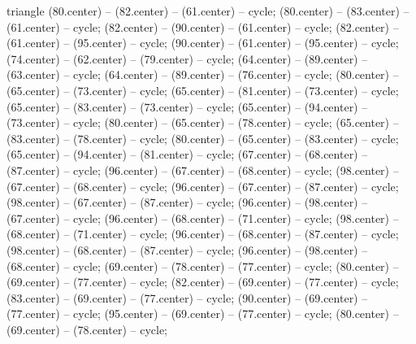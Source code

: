 \begin{pgfonlayer}{triangle}
 (80.center) -- (82.center) -- (61.center) -- cycle; 
 (80.center) -- (83.center) -- (61.center) -- cycle; 
 (82.center) -- (90.center) -- (61.center) -- cycle; 
 (82.center) -- (61.center) -- (95.center) -- cycle; 
 (90.center) -- (61.center) -- (95.center) -- cycle; 
 (74.center) -- (62.center) -- (79.center) -- cycle; 
 (64.center) -- (89.center) -- (63.center) -- cycle; 
 (64.center) -- (89.center) -- (76.center) -- cycle; 
 (80.center) -- (65.center) -- (73.center) -- cycle; 
 (65.center) -- (81.center) -- (73.center) -- cycle; 
 (65.center) -- (83.center) -- (73.center) -- cycle; 
 (65.center) -- (94.center) -- (73.center) -- cycle; 
 (80.center) -- (65.center) -- (78.center) -- cycle; 
 (65.center) -- (83.center) -- (78.center) -- cycle; 
 (80.center) -- (65.center) -- (83.center) -- cycle; 
 (65.center) -- (94.center) -- (81.center) -- cycle; 
 (67.center) -- (68.center) -- (87.center) -- cycle; 
 (96.center) -- (67.center) -- (68.center) -- cycle; 
 (98.center) -- (67.center) -- (68.center) -- cycle; 
 (96.center) -- (67.center) -- (87.center) -- cycle; 
 (98.center) -- (67.center) -- (87.center) -- cycle; 
 (96.center) -- (98.center) -- (67.center) -- cycle; 
 (96.center) -- (68.center) -- (71.center) -- cycle; 
 (98.center) -- (68.center) -- (71.center) -- cycle; 
 (96.center) -- (68.center) -- (87.center) -- cycle; 
 (98.center) -- (68.center) -- (87.center) -- cycle; 
 (96.center) -- (98.center) -- (68.center) -- cycle; 
 (69.center) -- (78.center) -- (77.center) -- cycle; 
 (80.center) -- (69.center) -- (77.center) -- cycle; 
 (82.center) -- (69.center) -- (77.center) -- cycle; 
 (83.center) -- (69.center) -- (77.center) -- cycle; 
 (90.center) -- (69.center) -- (77.center) -- cycle; 
 (95.center) -- (69.center) -- (77.center) -- cycle; 
 (80.center) -- (69.center) -- (78.center) -- cycle; 

\end{pgfonlayer}
